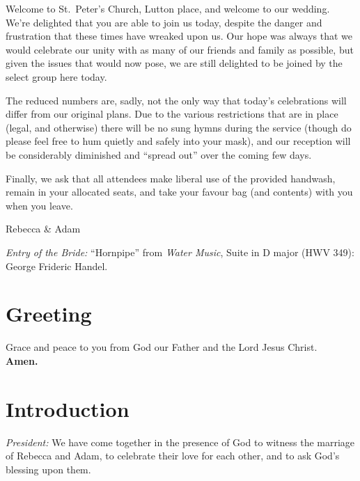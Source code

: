 \documentclass[a4paper,12pt,titlepage]{article}
\begin{document}
\begin{titlepage}
    \vspace{3cm}

\end{titlepage}

\hspace{2em}Welcome to St.~Peter's Church, Lutton place, and welcome to our wedding. We're delighted that you are able to join us today, despite the danger and frustration that these times have wreaked upon us. Our hope was always that we would celebrate our unity with as many of our friends and family as possible, but given the issues that would now pose, we are still delighted to be joined by the select group here today.

\hspace{2em}The reduced numbers are, sadly, not the only way that today's celebrations will differ from our original plans. Due to the various restrictions that are in place (legal, and otherwise) there will be no sung hymns during the service (though do please feel free to hum quietly and safely into your mask), and our reception will be considerably diminished and ``spread out'' over the coming few days.

\hspace{2em}Finally, we ask that all attendees make liberal use of the provided handwash, remain in your allocated seats, and take your favour bag (and contents) with you when you leave.

\begin{flushright}
Rebecca \& Adam
\end{flushright}

\vspace*{\fill}

{\em Entry of the Bride:} ``Hornpipe'' from {\em Water Music}, Suite in D major (HWV 349): George Frideric Handel.

\section{Greeting} 

Grace and peace to you from God our Father and the Lord Jesus Christ. \\

{\bf Amen.}

\clearpage

\section{Introduction} 
{\em President:} We have come together in the presence of God to witness the marriage of Rebecca and Adam, to celebrate their love for each other, and to ask God's blessing upon them.\\
\end{document}
